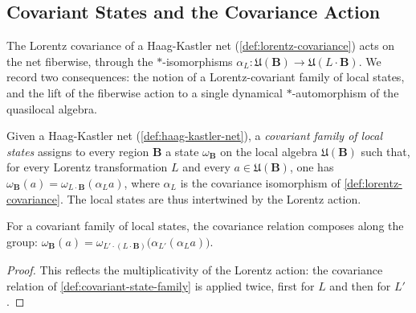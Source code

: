 \subsection{Covariant States and the Covariance Action}

The Lorentz covariance of a Haag-Kastler net (\ref{def:lorentz-covariance}) acts on the net fiberwise, through the $*$-isomorphisms $\alpha_L : \mathfrak{U}(\mathbf{B}) \to \mathfrak{U}(L\cdot\mathbf{B})$. We record two consequences: the notion of a Lorentz-covariant family of local states, and the lift of the fiberwise action to a single dynamical $*$-automorphism of the quasilocal algebra.

\begin{definition}
    \label{def:covariant-state-family}
    \leanok
    Given a Haag-Kastler net (\ref{def:haag-kastler-net}), a \emph{covariant family of local states} assigns to every region $\mathbf{B}$ a state $\omega_{\mathbf{B}}$ on the local algebra $\mathfrak{U}(\mathbf{B})$ such that, for every Lorentz transformation $L$ and every $a \in \mathfrak{U}(\mathbf{B})$, one has $\omega_{\mathbf{B}}(a) = \omega_{L\cdot\mathbf{B}}(\alpha_L a)$, where $\alpha_L$ is the covariance isomorphism of \ref{def:lorentz-covariance}. The local states are thus intertwined by the Lorentz action.
\end{definition}

\begin{lemma}
    \label{lmm:covariant-state-family-compose}
    \leanok
    For a covariant family of local states, the covariance relation composes along the group: $\omega_{\mathbf{B}}(a) = \omega_{L'\cdot(L\cdot\mathbf{B})}\big(\alpha_{L'}(\alpha_L a)\big)$.
\end{lemma}
\begin{proof}
    \leanok
    This reflects the multiplicativity of the Lorentz action: the covariance relation of \ref{def:covariant-state-family} is applied twice, first for $L$ and then for $L'$.
\end{proof}

